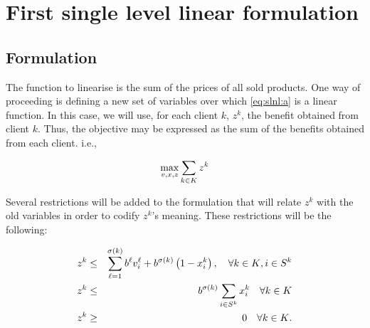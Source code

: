 \section{First single level linear formulation} %
\label{sec:las:sll1}

\subsection{Formulation} %
\label{ssc:las:sll1:formulation}

The function to linearise is the sum of the prices of all sold products.  One
way of proceeding is defining a new set of variables over which
\eqref{eq:slnl:a} is a linear function. In this case, we will use, for each
client $k$, $z^k$, the benefit obtained from client $k$. Thus, the objective may
be expressed as the sum of the benefits obtained from each client. i.e.,

\[
    \max_{v,x,z} \sum_{k \in K} z^k
\]

Several restrictions will be added to the formulation that will relate $z^k$
with the old variables in order to codify $z^k$'s meaning. These restrictions
will be the following:

{
    \newcommand{\suml} {\sum_{\ell=1}^{\sigma(k)}}
    \newcommand{\sumi} {\sum_\is}
    
    \begin{eqnarray}
        z^k &\leq& \suml b^\ell v_i^\ell + b^{\sigma(k)}\left(1-x_i^k\right),
            \quad \forall\kk, \is \label{eq:sll1-prev:a}\\
        z^k &\leq& b^{\sigma(k)} \sumi x_i^k
            \quad \forall\kk      \label{eq:sll1-prev:b}\\
        z^k &\geq& 0
            \quad \forall\kk.     \label{eq:sll1-prev:c}
    \end{eqnarray}
}

